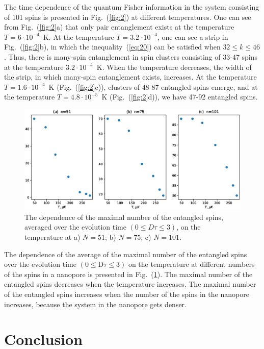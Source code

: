 \documentclass[review]{elsarticle}
\begin{document}
The time dependence of the quantum Fisher information in the system consisting of 101 spins is presented in Fig.~(\ref{fig:2}) at different temperatures. 
One can see from Fig.~(\ref{fig:2}a) that only pair entanglement exists at the temperature $T=6\cdot10^{-4}$~K.
At the temperature $T=3.2\cdot10^{-4}$, one can see a strip in Fig.~(\ref{fig:2}b), in which the inequality~(\ref{eq:20}) can be satisfied when ${32}\leq {k}\leq{46}$.
Thus, there is many-spin entanglement in spin clusters consisting of 33-47 spins at the temperature $3.2\cdot10^{-4}$~K.
When the temperature decreases, the width of the strip, in which many-spin entanglement exists, increases. 
At the temperature $T=1.6\cdot10^{-4}$~K (Fig.~(\ref{fig:2}c)), clusters of 48-87 entangled spins emerge, and at the temperature $T=4.8\cdot10^{-5}$~K (Fig.~(\ref{fig:2}d)), we have 47-92 entangled spins.

\begin{figure}
  	\includegraphics[width=0.95\linewidth]{entangled_spins_by_n.eps}
	\caption{
	    The dependence of the maximal number of the entangled spins,
	    averaged over the evolution time $(0 \leq D\tau \leq 3)$, 
	    on the temperature at a) $N=51$; b) $N=75$; c) $N=101$.
	}
	\label{fig:3}
\end{figure}

The dependence of the average of the maximal number of the entangled spins over the evolution time $({0}\leq \mathrm{D}\tau\leq{3})$ on the temperature at different numbers of the spins in a nanopore is presented in Fig.~(\ref{fig:3}).
The maximal number of the entangled spins decreases when the temperature increases. 
The maximal number of the entangled spins increases when the number of the spins in the nanopore increases, because the system in the nanopore gets denser. 



\section{Conclusion}
\label{sec:6}
\end{document}

